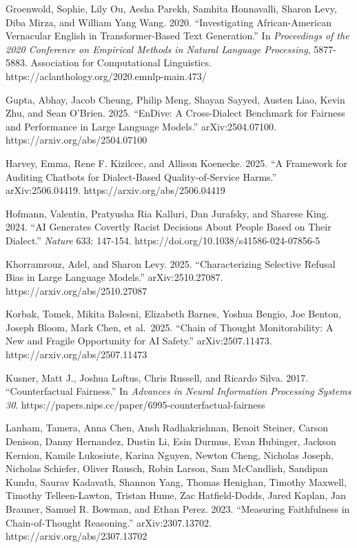 \documentclass[
  letterpaper,
  11pt]{article}
\begin{document}
Groenwold, Sophie, Lily Ou, Aesha Parekh, Samhita Honnavalli, Sharon
Levy, Diba Mirza, and William Yang Wang. 2020. ``Investigating
African-American Vernacular English in Transformer-Based Text
Generation.'' In \emph{Proceedings of the 2020 Conference on Empirical
Methods in Natural Language Processing}, 5877-5883. Association for
Computational Linguistics. https://aclanthology.org/2020.emnlp-main.473/

Gupta, Abhay, Jacob Cheung, Philip Meng, Shayan Sayyed, Austen Liao,
Kevin Zhu, and Sean O'Brien. 2025. ``EnDive: A Cross-Dialect Benchmark
for Fairness and Performance in Large Language Models.''
arXiv:2504.07100. https://arxiv.org/abs/2504.07100

Harvey, Emma, Rene F. Kizilcec, and Allison Koenecke. 2025. ``A
Framework for Auditing Chatbots for Dialect-Based Quality-of-Service
Harms.'' arXiv:2506.04419. https://arxiv.org/abs/2506.04419

Hofmann, Valentin, Pratyusha Ria Kalluri, Dan Jurafsky, and Sharese
King. 2024. ``AI Generates Covertly Racist Decisions About People Based
on Their Dialect.'' \emph{Nature} 633: 147-154.
https://doi.org/10.1038/s41586-024-07856-5

Khorramrouz, Adel, and Sharon Levy. 2025. ``Characterizing Selective
Refusal Bias in Large Language Models.'' arXiv:2510.27087.
https://arxiv.org/abs/2510.27087

Korbak, Tomek, Mikita Balesni, Elizabeth Barnes, Yoshua Bengio, Joe
Benton, Joseph Bloom, Mark Chen, et al.~2025. ``Chain of Thought
Monitorability: A New and Fragile Opportunity for AI Safety.''
arXiv:2507.11473. https://arxiv.org/abs/2507.11473

Kusner, Matt J., Joshua Loftus, Chris Russell, and Ricardo Silva. 2017.
``Counterfactual Fairness.'' In \emph{Advances in Neural Information
Processing Systems 30}.
https://papers.nips.cc/paper/6995-counterfactual-fairness

Lanham, Tamera, Anna Chen, Ansh Radhakrishnan, Benoit Steiner, Carson
Denison, Danny Hernandez, Dustin Li, Esin Durmus, Evan Hubinger, Jackson
Kernion, Kamile Lukosiute, Karina Nguyen, Newton Cheng, Nicholas Joseph,
Nicholas Schiefer, Oliver Rausch, Robin Larson, Sam McCandlish, Sandipan
Kundu, Saurav Kadavath, Shannon Yang, Thomas Henighan, Timothy Maxwell,
Timothy Telleen-Lawton, Tristan Hume, Zac Hatfield-Dodds, Jared Kaplan,
Jan Brauner, Samuel R. Bowman, and Ethan Perez. 2023. ``Measuring
Faithfulness in Chain-of-Thought Reasoning.'' arXiv:2307.13702.
https://arxiv.org/abs/2307.13702
\end{document}
